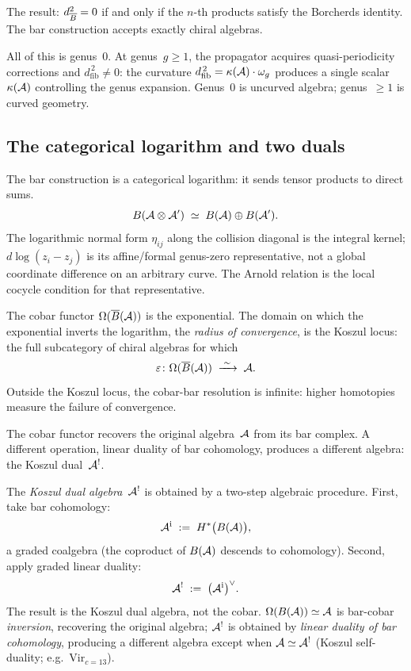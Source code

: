 The result: $d_{\overline{B}}^2=0$ if and only if the $n$-th products
satisfy the Borcherds identity. The bar construction accepts
exactly chiral algebras.

All of this is genus~$0$. At genus~$g \geq 1$, the propagator acquires
quasi-periodicity corrections and $d_{\mathrm{fib}}^{\,2} \neq 0$:
the curvature $d_{\mathrm{fib}}^{\,2} = \kappa(\mathcal{A}) \cdot \omega_g$
produces a single scalar $\kappa(\mathcal{A})$ controlling the genus
expansion. Genus~$0$ is uncurved algebra;
genus~$\geq 1$ is curved geometry.


\subsection*{The categorical logarithm and two duals}

The bar construction is a categorical logarithm: it sends tensor
products to direct sums.
\[
B(\mathcal{A}\otimes\mathcal{A}')
\;\simeq\;
B(\mathcal{A})\oplus B(\mathcal{A}').
\]
The logarithmic normal form \(\eta_{ij}\) along the collision diagonal
is the integral kernel; \(d\log(z_i-z_j)\) is its affine/formal
genus-zero representative, not a global coordinate difference on an
arbitrary curve. The Arnold relation is the local cocycle condition for
that representative.

The cobar functor $\Omega(\overline{B}(\mathcal{A}))$ is the exponential. The
domain on which the exponential inverts the logarithm, the
\emph{radius of convergence}, is the Koszul locus: the full
subcategory of chiral algebras for which
\[
\varepsilon\colon\Omega(\overline{B}(\mathcal{A}))
\;\xrightarrow{\;\sim\;}\;
\mathcal{A}.
\]
Outside the Koszul locus, the cobar-bar resolution is infinite:
higher homotopies measure the failure of convergence.

The cobar functor recovers the original algebra~$\mathcal{A}$ from its
bar complex. A different operation, linear duality of bar cohomology,
produces a different algebra: the Koszul dual~$\mathcal{A}^!$.

The \emph{Koszul dual algebra}~$\mathcal{A}^!$ is obtained by a two-step
algebraic procedure. First, take bar cohomology:
\[
\mathcal{A}^{\mathrm i}
\;:=\;
H^*\bigl(B(\mathcal{A})\bigr),
\]
a graded coalgebra (the coproduct of $B(\mathcal{A})$ descends to
cohomology). Second, apply graded linear duality:
\[
\mathcal{A}^!
\;:=\;
\bigl(\mathcal{A}^{\mathrm i}\bigr)^\vee.
\]
The result is the Koszul dual algebra, not the cobar.
$\Omega(B(\mathcal{A}))\simeq\mathcal{A}$ is bar-cobar \emph{inversion},
recovering the original algebra; $\mathcal{A}^!$ is obtained by
\emph{linear duality of bar cohomology}, producing a different
algebra except when $\mathcal{A}\simeq\mathcal{A}^!$ (Koszul self-duality; e.g.\ $\mathrm{Vir}_{c=13}$).

